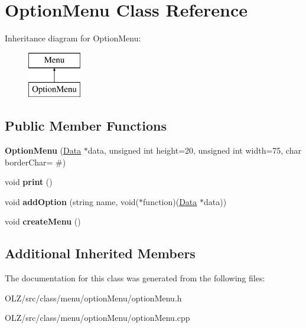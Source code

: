 \hypertarget{class_option_menu}{}\section{Option\+Menu Class Reference}
\label{class_option_menu}
Inheritance diagram for Option\+Menu\+:\begin{figure}[H]
\begin{center}
\leavevmode
\includegraphics[height=2.000000cm]{class_option_menu}
\end{center}
\end{figure}
\subsection*{Public Member Functions}
\begin{DoxyCompactItemize}
\item 
\hypertarget{class_option_menu_a76889e484d801886f5d48180e4f64a31}{}{\bfseries Option\+Menu} (\hyperlink{class_data}{Data} $\ast$data, unsigned int height=20, unsigned int width=75, char border\+Char= \textquotesingle{}\#\textquotesingle{})\label{class_option_menu_a76889e484d801886f5d48180e4f64a31}

\item 
\hypertarget{class_option_menu_a753b91d8c99330c962d6ecbe520800d2}{}void {\bfseries print} ()\label{class_option_menu_a753b91d8c99330c962d6ecbe520800d2}

\item 
\hypertarget{class_option_menu_a82ce2285fb79bec7073b5358648f19b6}{}void {\bfseries add\+Option} (string name, void($\ast$function)(\hyperlink{class_data}{Data} $\ast$data))\label{class_option_menu_a82ce2285fb79bec7073b5358648f19b6}

\item 
\hypertarget{class_option_menu_a30620df0e9871ce3bbdccf3cb094785f}{}void {\bfseries create\+Menu} ()\label{class_option_menu_a30620df0e9871ce3bbdccf3cb094785f}

\end{DoxyCompactItemize}
\subsection*{Additional Inherited Members}


The documentation for this class was generated from the following files\+:\begin{DoxyCompactItemize}
\item 
O\+L\+Z/src/class/menu/option\+Menu/option\+Menu.\+h\item 
O\+L\+Z/src/class/menu/option\+Menu/option\+Menu.\+cpp\end{DoxyCompactItemize}
